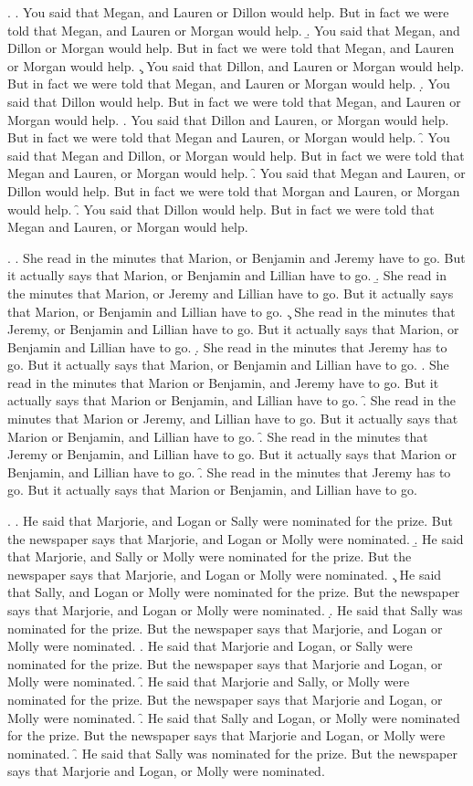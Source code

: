 \documentclass[preprint,review,12pt,authoryear,times]{elsarticle}
\begin{document}
\ex. 
\a. You said that Megan, and Lauren or Dillon would help. But in fact we were told that Megan, and Lauren or Morgan would help.
\b. You said that Megan, and Dillon or Morgan would help. But in fact we were told that Megan, and Lauren or Morgan would help.
\c. You said that Dillon, and Lauren or Morgan would help. But in fact we were told that Megan, and Lauren or Morgan would help.
\d. You said that Dillon would help. But in fact we were told that Megan, and Lauren or Morgan would help.
\e. You said that Dillon and Lauren, or Morgan would help. But in fact we were told that Megan and Lauren, or Morgan would help.
\f. You said that Megan and Dillon, or Morgan would help. But in fact we were told that Megan and Lauren, or Morgan would help.
\f. You said that Megan and Lauren, or Dillon would help. But in fact we were told that Morgan and Lauren, or Morgan would help.
\f. You said that Dillon would help. But in fact we were told that Megan and Lauren, or Morgan would help.

\ex. 
\a. She read in the minutes that Marion, or Benjamin and Jeremy have to go. But it actually says that Marion, or Benjamin and Lillian have to go.
\b. She read in the minutes that Marion, or Jeremy and Lillian have to go. But it actually says that Marion, or Benjamin and Lillian have to go.
\c. She read in the minutes that Jeremy, or Benjamin and Lillian have to go. But it actually says that Marion, or Benjamin and Lillian have to go.
\d. She read in the minutes that Jeremy has to go. But it actually says that Marion, or Benjamin and Lillian have to go.
\e. She read in the minutes that Marion or Benjamin, and Jeremy have to go. But it actually says that Marion or Benjamin, and Lillian have to go.
\f. She read in the minutes that Marion or Jeremy, and Lillian have to go. But it actually says that Marion or Benjamin, and Lillian have to go.
\f. She read in the minutes that Jeremy or Benjamin, and Lillian have to go. But it actually says that Marion or Benjamin, and Lillian have to go.
\f. She read in the minutes that Jeremy has to go. But it actually says that Marion or Benjamin, and Lillian have to go.

\ex. 
\a. He said that Marjorie, and Logan or Sally were nominated for the prize. But the newspaper says that Marjorie, and Logan or Molly were nominated.  
\b. He said that Marjorie, and Sally or Molly were nominated for the prize. But the newspaper says that Marjorie, and Logan or Molly were nominated.
\c. He said that Sally, and Logan or Molly were nominated for the prize. But the newspaper says that Marjorie, and Logan or Molly were nominated.
\d. He said that Sally was nominated for the prize. But the newspaper says that Marjorie, and Logan or Molly were nominated.
\e. He said that Marjorie and Logan, or Sally were nominated for the prize. But the newspaper says that  Marjorie and Logan, or Molly were nominated.
\f. He said that Marjorie and Sally, or Molly were nominated for the prize. But the newspaper says that  Marjorie and Logan, or Molly were nominated.
\f. He said that Sally and Logan, or Molly were nominated for the prize. But the newspaper says that  Marjorie and Logan, or Molly were nominated.
\f. He said that Sally was nominated for the prize. But the newspaper says that  Marjorie and Logan, or Molly were nominated.
\end{document}
